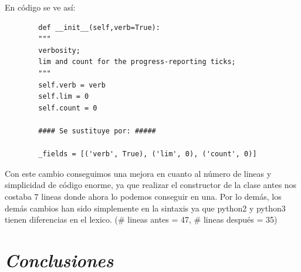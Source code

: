 \documentclass{cosas/tfg_domingo}
\begin{document}
\begin{itemize}
En código se ve así:
\begin{verbatim}
        def __init__(self,verb=True):
        """
        verbosity;
        lim and count for the progress-reporting ticks;
        """
        self.verb = verb
        self.lim = 0
        self.count = 0
        
        #### Se sustituye por: #####
        
        _fields = [('verb', True), ('lim', 0), ('count', 0)]
\end{verbatim}

Con este cambio conseguimos una mejora en cuanto al número de lineas y simplicidad de código enorme, ya que realizar el constructor de la clase antes nos costaba 7 lineas donde ahora lo podemos conseguir en una. Por lo demás, los demás cambios han sido simplemente en la sintaxis ya que python2 y python3 tienen diferencias en el lexico. (\# lineas antes = 47, \# lineas después = 35)
\end{itemize}

\chapter{\emph{Conclusiones}}


\end{document}
